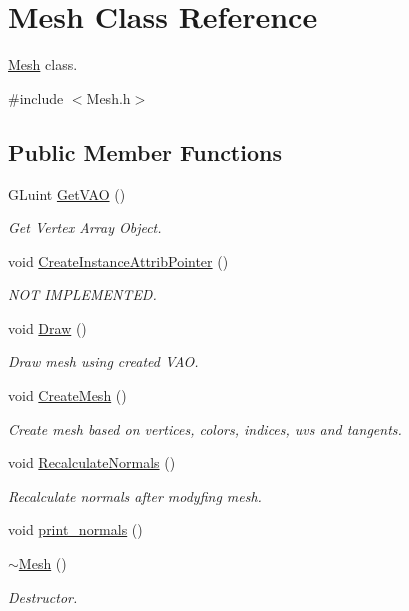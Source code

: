 \hypertarget{class_mesh}{}\section{Mesh Class Reference}
\label{class_mesh}


\mbox{\hyperlink{class_mesh}{Mesh}} class.  




{\ttfamily \#include $<$Mesh.\+h$>$}

\subsection*{Public Member Functions}
\begin{DoxyCompactItemize}
\item 
G\+Luint \mbox{\hyperlink{class_mesh_ad4917bc56c71f31974af4be3eb90a390}{Get\+V\+AO}} ()
\begin{DoxyCompactList}\small\item\em Get Vertex Array Object. \end{DoxyCompactList}\item 
void \mbox{\hyperlink{class_mesh_a916735fb6745a444abc21011e11ed3e4}{Create\+Instance\+Attrib\+Pointer}} ()
\begin{DoxyCompactList}\small\item\em N\+OT I\+M\+P\+L\+E\+M\+E\+N\+T\+ED. \end{DoxyCompactList}\item 
void \mbox{\hyperlink{class_mesh_afdd95c079fd0442afef8a6c421c8bfc9}{Draw}} ()
\begin{DoxyCompactList}\small\item\em Draw mesh using created V\+AO. \end{DoxyCompactList}\item 
void \mbox{\hyperlink{class_mesh_ab4d75bfd6e4603aa774eba1cfb83bffe}{Create\+Mesh}} ()
\begin{DoxyCompactList}\small\item\em Create mesh based on vertices, colors, indices, uvs and tangents. \end{DoxyCompactList}\item 
void \mbox{\hyperlink{class_mesh_a2688a608e0185faef28105fae57ad76d}{Recalculate\+Normals}} ()
\begin{DoxyCompactList}\small\item\em Recalculate normals after modyfing mesh. \end{DoxyCompactList}\item 
void \mbox{\hyperlink{class_mesh_a0cf3f3f0bacd461a12ddff31acbdb6bf}{print\+\_\+normals}} ()
\item 
\mbox{\hyperlink{class_mesh_a5efe4da1a4c0971cfb037bd70304c303}{$\sim$\+Mesh}} ()
\begin{DoxyCompactList}\small\item\em Destructor. \end{DoxyCompactList}\end{DoxyCompactItemize}
